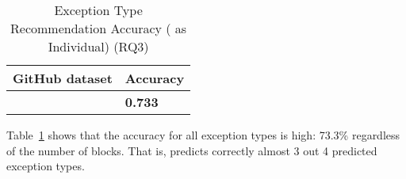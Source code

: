 \begin{table}[t]%
  \caption{Exception Type Recommendation Accuracy ({\xtype} as Individual) (RQ3)}
  \vspace{-12pt}
  \small
	\begin{center}
		\renewcommand{\arraystretch}{1}
		\begin{tabular}{| p{3.05cm}<{\centering} | p{1.2cm}<{\centering}|}
		  \hline
			GitHub dataset  & Accuracy \\
			\hline
			\xtype   & \textbf{0.733} \\
			\hline
		\end{tabular}
		\label{tab:xtype-3}
	\end{center}
\end{table}

Table~\ref{tab:xtype-3} shows that the accuracy for all exception
types is high: 73.3\% regardless of the number of blocks. That is,
{\xtype} predicts correctly almost 3 out 4 predicted exception types.
